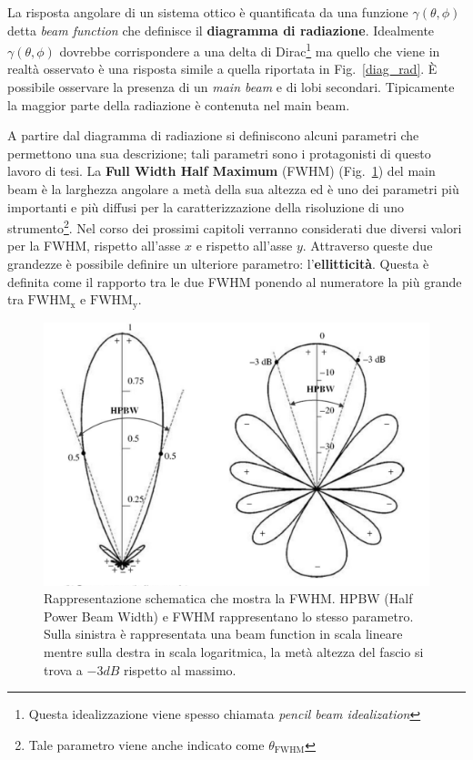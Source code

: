 \documentclass[12pt,a4paper,final]{book}
\begin{document}
La risposta angolare di un sistema ottico è quantificata da una funzione $\gamma(\theta,\phi)$ detta \textit{beam function} che definisce il \textbf{diagramma di radiazione}. Idealmente $\gamma(\theta,\phi)$ dovrebbe corrispondere a una delta di Dirac\footnote{Questa idealizzazione viene spesso chiamata \textit{pencil beam idealization}} ma quello che viene in realtà osservato è una risposta simile a quella riportata in Fig.~\ref{diag_rad}.
\`E possibile osservare la presenza di un \textit{main beam} e di lobi secondari. Tipicamente la maggior parte della radiazione è contenuta nel main beam.


A partire dal diagramma di radiazione si definiscono alcuni parametri che permettono una sua descrizione; tali parametri sono i protagonisti di questo lavoro di tesi.
La \textbf{Full Width Half Maximum} (FWHM) (Fig.~\ref{fwhm}) del main beam è la larghezza angolare a metà della sua altezza ed è uno dei parametri più importanti e più diffusi per la caratterizzazione della risoluzione di uno strumento\footnote{Tale parametro viene anche indicato come $\theta_\text{FWHM}$}. Nel corso dei prossimi capitoli verranno considerati due diversi valori per la FWHM, rispetto all'asse $x$ e rispetto all'asse $y$. Attraverso queste due grandezze è possibile definire un ulteriore parametro: l'\textbf{ellitticità}. Questa è definita come il rapporto tra le due FWHM ponendo al numeratore la più grande tra $\text{FWHM}_\text{x}$ e $\text{FWHM}_\text{y}$.
\begin{figure}[!ht]
	\centering
	\includegraphics[width=0.7\linewidth]{../figures/fwhm.png}
	\caption{Rappresentazione schematica che mostra la FWHM. HPBW (Half Power Beam Width) e FWHM rappresentano lo stesso parametro. Sulla sinistra è rappresentata una beam function in scala lineare mentre sulla destra in scala logaritmica, la metà altezza del fascio si trova a $-3 \unit{dB}$ rispetto al massimo.}
	\label{fwhm}
\end{figure}
\end{document}
